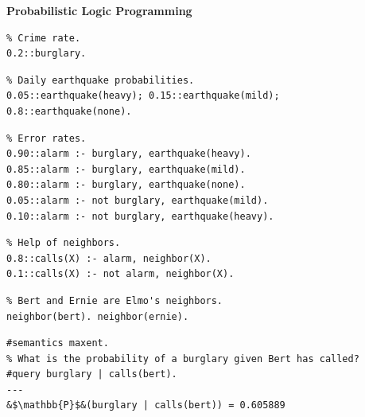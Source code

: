 \documentclass[aspectratio=169]{beamer}
\begin{document}
\begin{frame}[fragile]{\textbf{Probabilistic Logic Programming}}
\begin{minipage}{0.5\textwidth}
  \begin{verbatim}
% Crime rate.
0.2::burglary.
  \end{verbatim}
  \pause%
  \begin{verbatim}
% Daily earthquake probabilities.
0.05::earthquake(heavy); 0.15::earthquake(mild); 0.8::earthquake(none).
  \end{verbatim}
  \pause%
  \begin{verbatim}
% Error rates.
0.90::alarm :- burglary, earthquake(heavy).
0.85::alarm :- burglary, earthquake(mild).
0.80::alarm :- burglary, earthquake(none).
0.05::alarm :- not burglary, earthquake(mild).
0.10::alarm :- not burglary, earthquake(heavy).
  \end{verbatim}
  \pause%
  \begin{verbatim}
% Help of neighbors.
0.8::calls(X) :- alarm, neighbor(X).
0.1::calls(X) :- not alarm, neighbor(X).
  \end{verbatim}
  \pause%
  \begin{verbatim}
% Bert and Ernie are Elmo's neighbors.
neighbor(bert). neighbor(ernie).
  \end{verbatim}
  \pause%
  \begin{verbatim}
#semantics maxent.
% What is the probability of a burglary given Bert has called?
#query burglary | calls(bert).
---
&$\mathbb{P}$&(burglary | calls(bert)) = 0.605889
  \end{verbatim}
\end{minipage}%
\begin{minipage}{0.5\textwidth}
  \pause
  \centering\footnotesize\color{palette-yellow}
\end{minipage}
\end{frame}

\end{document}
